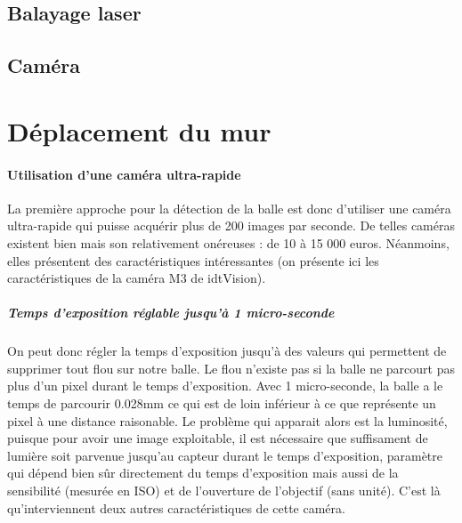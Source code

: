 \section{Balayage laser}

\section{Caméra}










\chapter{Déplacement du mur}




\subsubsection{Utilisation d'une caméra ultra-rapide}

La première approche pour la détection de la balle est donc d'utiliser une caméra ultra-rapide qui puisse acquérir plus de 200 images par seconde. De telles caméras existent bien mais son relativement onéreuses : de 10 à 15 000 euros. Néanmoins, elles présentent des caractéristiques intéressantes (on présente ici les caractéristiques de la caméra M3 de idtVision).

\paragraph{Temps d'exposition réglable jusqu'à 1 micro-seconde\\}

On peut donc régler la temps d'exposition jusqu'à des valeurs qui permettent de supprimer tout flou sur notre balle. Le flou n'existe pas si la balle ne parcourt pas plus d'un pixel durant le temps d'exposition. Avec 1 micro-seconde, la balle a le temps de parcourir 0.028mm ce qui est de loin inférieur à ce que représente un pixel à une distance raisonable. Le problème qui apparait alors est la luminosité, puisque pour avoir une image exploitable, il est nécessaire que suffisament de lumière soit parvenue jusqu'au capteur durant le temps d'exposition, paramètre qui dépend bien sûr directement du temps d'exposition mais aussi de la sensibilité (mesurée en ISO) et de l'ouverture de l'objectif (sans unité). C'est là qu'interviennent deux autres caractéristiques de cette caméra. 

